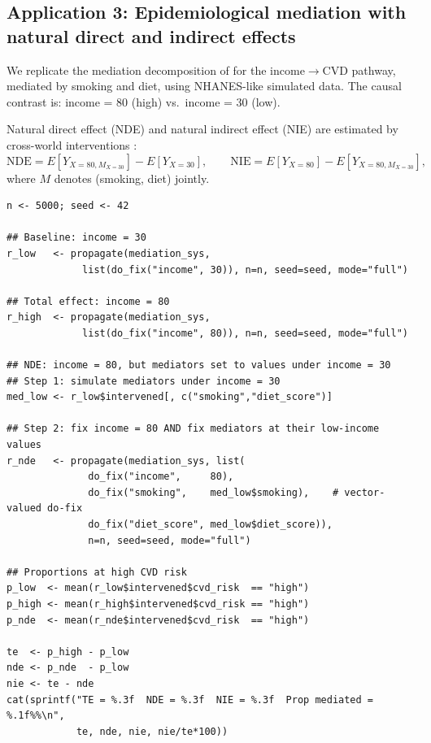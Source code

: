 \documentclass[12pt,a4paper]{article}
\begin{document}
\subsection{Application 3: Epidemiological mediation with natural direct and indirect effects}
\label{sec:app_mediation}

We replicate the mediation decomposition of \citet{vanderweele2015explanation}
for the income$\to$CVD pathway, mediated by smoking and diet, using NHANES-like
simulated data. The causal contrast is: income = 80 (high) vs.\ income = 30 (low).

Natural direct effect (NDE) and natural indirect effect (NIE) are estimated by
cross-world interventions \citep{robins1992identifiability, pearl2001direct}:
\[
  \mathrm{NDE} = E[Y_{X=80, M_{X=30}}] - E[Y_{X=30}], \qquad
  \mathrm{NIE} = E[Y_{X=80}] - E[Y_{X=80, M_{X=30}}],
\]
where $M$ denotes (smoking, diet) jointly.

\begin{tcolorbox}[codebox, title={\small\textbf{R} code --- NDE / NIE}]
\begin{verbatim}
n <- 5000; seed <- 42

## Baseline: income = 30
r_low   <- propagate(mediation_sys,
             list(do_fix("income", 30)), n=n, seed=seed, mode="full")

## Total effect: income = 80
r_high  <- propagate(mediation_sys,
             list(do_fix("income", 80)), n=n, seed=seed, mode="full")

## NDE: income = 80, but mediators set to values under income = 30
## Step 1: simulate mediators under income = 30
med_low <- r_low$intervened[, c("smoking","diet_score")]

## Step 2: fix income = 80 AND fix mediators at their low-income values
r_nde   <- propagate(mediation_sys, list(
              do_fix("income",     80),
              do_fix("smoking",    med_low$smoking),    # vector-valued do-fix
              do_fix("diet_score", med_low$diet_score)),
              n=n, seed=seed, mode="full")

## Proportions at high CVD risk
p_low  <- mean(r_low$intervened$cvd_risk  == "high")
p_high <- mean(r_high$intervened$cvd_risk == "high")
p_nde  <- mean(r_nde$intervened$cvd_risk  == "high")

te  <- p_high - p_low
nde <- p_nde  - p_low
nie <- te - nde
cat(sprintf("TE = %.3f  NDE = %.3f  NIE = %.3f  Prop mediated = %.1f%%\n",
            te, nde, nie, nie/te*100))
\end{verbatim}
\end{tcolorbox}
\end{document}
